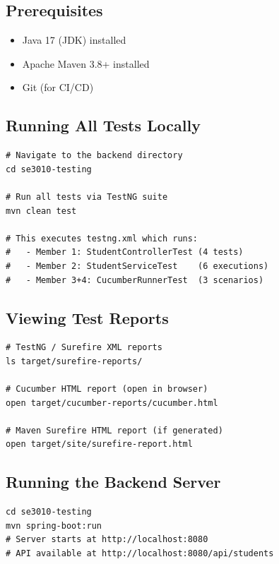 \documentclass[12pt,a4paper]{article}
\begin{document}
\subsection{Prerequisites}
\begin{itemize}
    \item Java 17 (JDK) installed
    \item Apache Maven 3.8+ installed
    \item Git (for CI/CD)
\end{itemize}

\subsection{Running All Tests Locally}

\begin{lstlisting}[style=bashstyle, caption={Run the complete test suite}]
# Navigate to the backend directory
cd se3010-testing

# Run all tests via TestNG suite
mvn clean test

# This executes testng.xml which runs:
#   - Member 1: StudentControllerTest (4 tests)
#   - Member 2: StudentServiceTest    (6 executions)
#   - Member 3+4: CucumberRunnerTest  (3 scenarios)
\end{lstlisting}

\subsection{Viewing Test Reports}

\begin{lstlisting}[style=bashstyle, caption={Locate and open test reports after execution}]
# TestNG / Surefire XML reports
ls target/surefire-reports/

# Cucumber HTML report (open in browser)
open target/cucumber-reports/cucumber.html

# Maven Surefire HTML report (if generated)
open target/site/surefire-report.html
\end{lstlisting}

\subsection{Running the Backend Server}

\begin{lstlisting}[style=bashstyle, caption={Start the Spring Boot application}]
cd se3010-testing
mvn spring-boot:run
# Server starts at http://localhost:8080
# API available at http://localhost:8080/api/students
\end{lstlisting}
\end{document}
